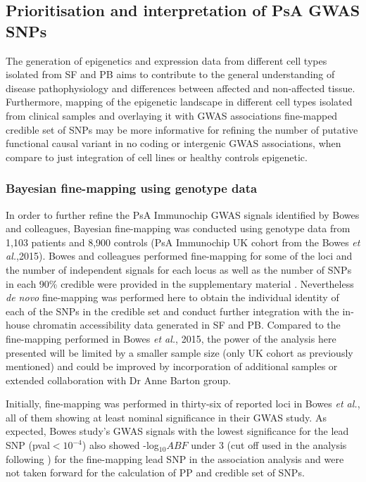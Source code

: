 \subsection{Prioritisation and interpretation of PsA GWAS SNPs}

The generation of epigenetics and expression data from different cell types isolated from SF and PB aims to contribute to the general understanding of disease pathophysiology and differences between affected and non-affected tissue. Furthermore, mapping of the epigenetic landscape in different cell types isolated from clinical samples and overlaying it with GWAS associations fine-mapped credible set of SNPs may be more informative for refining the number of putative functional causal variant in no coding or intergenic GWAS associations, when compare to just integration of cell lines or healthy controls epigenetic.

\subsubsection{Bayesian fine-mapping using genotype data}

In order to further refine the PsA Immunochip GWAS signals identified by Bowes and colleagues, Bayesian fine-mapping was conducted using genotype data from 1,103 patients and 8,900 controls (PsA Immunochip UK cohort from the Bowes \textit{et al.},2015). Bowes and colleagues performed fine-mapping for some of the loci and the number of independent signals for each locus as well as the number of SNPs in each 90\% credible were provided in the supplementary material \parencite{Bowes2015}. Nevertheless \textit{de novo} fine-mapping was performed here to obtain the individual identity of each of the SNPs in the credible set and conduct further integration with the in-house chromatin accessibility data generated in SF and PB. Compared to the fine-mapping performed in Bowes \textit{et al.}, 2015, the power of the analysis here presented will be limited by a smaller sample size (only UK cohort as previously mentioned) and could be improved by incorporation of additional samples or extended collaboration with Dr Anne Barton group. 

Initially, fine-mapping was performed in thirty-six of reported loci in Bowes \textit{et al.}, all of them showing at least nominal significance in their GWAS study. As expected, Bowes study's GWAS signals with the lowest significance for the lead SNP (pval$<10^{-4}$) also showed -log${_10}ABF$ under 3 (cut off used in the analysis following \parencite{Bunt2015}) for the fine-mapping lead SNP in the association analysis and were not taken forward for the calculation of PP and credible set of SNPs. 


